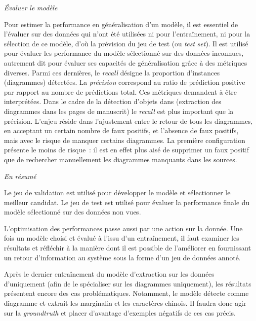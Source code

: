 \emph{Évaluer le modèle}

Pour estimer la performance en généralisation d'un modèle, il est
essentiel de l'évaluer sur des données qui n'ont été utilisées ni pour
l'entraînement, ni pour la sélection de ce modèle, d'où la prévision du
jeu de test (ou \textit{test set}). Il est utilisé pour évaluer les
performance du modèle sélectionné sur des données inconnues, autrement
dit pour évaluer ses capacités de généralisation grâce à des métriques
diverses. Parmi ces dernières, le \emph{recall} désigne la proportion
d'instances (diagrammes) détectées. La \emph{précision} correspond au
ratio de prédiction positive par rapport au nombre de prédictions total.
Ces métriques demandent à être interprétées.
Dans le cadre de la détection d'objets dans \eida (extraction des
diagrammes dans les pages de manuscrit) le \textit{recall} est plus important que
la précision. L'enjeu réside dans l'ajustement entre le retour de tous
les diagrammes, en acceptant un certain nombre de faux positifs, et
l'absence de faux positifs, mais avec le risque de manquer certains
diagrammes. La première configuration présente le moins de risque~: il
est en effet plus aisé de supprimer un faux positif que de rechercher
manuellement les diagrammes manquants dans les sources.

\emph{En résumé}

Le jeu de validation est utilisé pour développer le modèle et
sélectionner le meilleur candidat. Le jeu de test est utilisé pour
évaluer la performance finale du modèle sélectionné sur des données non
vues.

L'optimisation des performances passe aussi par une action sur la
donnée. Une fois un modèle choisi et évalué à l'issu d'un entraînement,
il faut examiner les résultats et réfléchir à la manière dont il est
possible de l'améliorer en fournissant un retour d'information au
système sous la forme d'un jeu de données annoté.

Après le dernier entraînement du modèle d'extraction sur les données
d'\eida uniquement (afin de le spécialiser sur les diagrammes
uniquement), les résultats présentent encore des cas problématiques.
Notamment, le modèle détecte comme diagramme et extrait les marginalia
et les caractères chinois. Il faudra donc agir sur la \textit{groundtruth} et
placer d'avantage d'exemples négatifs de ces cas précis.

